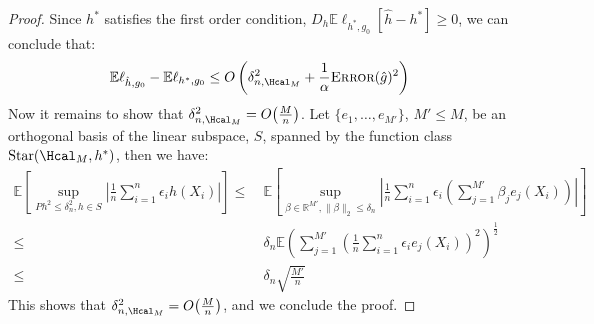 \documentclass[12pt]{extarticle} %
\newcommand{\E}{\mathbb{E}}
\newcommand{\error}{\ensuremath{\textsc{Error}}}
\begin{document}
\begin{proof}
Since $h^*$ satisfies the first order condition,
$D_{h}\E\ell_{h^*,g_0}[\hat{h}-h^*] \geq 0$, we can conclude that:
\begin{align*}
     \E\ell_{\hat{h},g_0} -  \E\ell_{h^*,g_0}\leq O\left(\delta_{n,\Hcal_M}^2  + \frac{1}{\alpha}\error(\hat{g})^2\right)
\end{align*}
Now it remains to show that $\delta_{n,\Hcal_M}^2 = O\big(\frac{M}{n}\big)$.
Let $\{e_1, \dots, e_{M'}\}$, $M'\leq M$, be an orthogonal basis of the linear subspace, $S$, spanned by the function class $\text{Star}(\Hcal_M,h^*)$, then we have:
\begin{align*}
    \E\left[\sup_{Ph^2\leq\delta_n^2 , h \in S}\left|\frac{1}{n}\sum_{i=1}^n \epsilon_i h(X_i)\right|\right]
    \leq~& \E\left[\sup_{\beta\in \mathbb{R}^{M'} , \|\beta\|_2 \leq \delta_n}\left|\frac{1}{n}\sum_{i=1}^n \epsilon_i \left(\sum_{j=1}^{M'}\beta_j e_j(X_i)\right)\right|\right]\\ \leq~&\delta_n\E\left(\sum_{j=1}^{M'}\left(\frac{1}{n}\sum_{i=1}^{n}\epsilon_i e_j(X_i)\right)^2\right)^{\frac{1}{2}} \tag{By the Cauchy-Schwarz inequality}\\
    \leq~& \delta_n\sqrt{\frac{M'}{n}}
\end{align*}
This shows that $\delta_{n,\Hcal_M}^2 = O\big(\frac{M}{n}\big)$, and we conclude the proof.
\end{proof}
\end{document}
